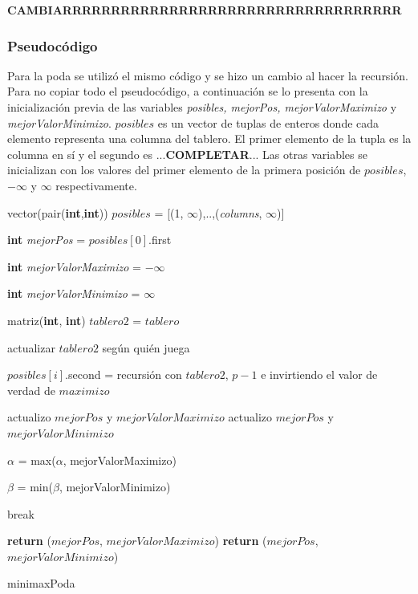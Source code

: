 \documentclass[A4paper,oneside,fleqn,11pt]{article}
\theoremstyle{definition}
\begin{document}
\textbf{CAMBIARRRRRRRRRRRRRRRRRRRRRRRRRRRRRRRRRRR}

\subsubsection{Pseudocódigo}
Para la poda se utilizó el mismo código y se hizo un cambio al hacer la recursión. Para no copiar todo el pseudocódigo, a continuación se lo presenta con la inicialización previa de las variables \textit{posibles, mejorPos, mejorValorMaximizo} y \textit{mejorValorMinimizo}. $posibles$ es un vector de tuplas de enteros donde cada elemento representa una columna del tablero. El primer elemento de la tupla es la columna en sí y el segundo es ...\textbf{COMPLETAR}... Las otras variables se inicializan con los valores del primer elemento de la primera posición de $posibles$, $-\infty$ y $\infty$ respectivamente.

\begin{algorithm}


    
    vector(pair(\textbf{int},\textbf{int})) $posibles$ = [(1, $\infty$),..,(\textit{columns}, $\infty$)]
    
    \textbf{int} \textit{mejorPos} = $posibles[0]$.first
    
    \textbf{int} \textit{mejorValorMaximizo} = $-\infty$
    
    \textbf{int} \textit{mejorValorMinimizo} = $\infty$
    
    	{
    	matriz(\textbf{int}, \textbf{int}) $tablero2$ = $tablero$
    	
    	actualizar $tablero2$ según quién juega
    	
    	
    	$posibles[i]$.second = recursión con $tablero2$, $p-1$ e invirtiendo el valor de verdad de $maximizo$
    	
    		{
    		actualizo $mejorPos$ y $mejorValorMaximizo$
    		}
    		{
    		actualizo $mejorPos$ y $mejorValorMinimizo$
    		}
    		
    	$\alpha$ = max($\alpha$, mejorValorMaximizo)
    	
    	$\beta$ = min($\beta$, mejorValorMinimizo)
    	
    	\If{$\alpha$ $\geq$ $\beta$}
    		{
    		break
    		}
    	}
    	
		{    	
    	\textbf{return} ($mejorPos$, $mejorValorMaximizo$)
    	}
    	{
    	\textbf{return} ($mejorPos$, $mejorValorMinimizo$)
    	}
    
    \caption{minimaxPoda}

\end{algorithm}
\end{document}
